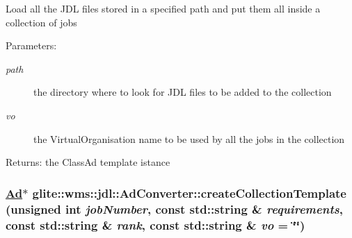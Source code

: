Load all the JDL files stored in a specified path and put them all inside a collection of jobs \begin{Desc}
\item[Parameters:]
\begin{description}
\item[{\em path}]the directory where to look for JDL files to be added to the collection \item[{\em vo}]the Virtual\-Organisation name to be used by all the jobs in the collection \end{description}
\end{Desc}
\begin{Desc}
\item[Returns:]the Class\-Ad template istance\end{Desc}
\hypertarget{classglite_1_1wms_1_1jdl_1_1AdConverter_z21_6}{
\subsubsection[createCollectionTemplate]{\setlength{\rightskip}{0pt plus 5cm}\hyperlink{classglite_1_1wms_1_1jdl_1_1Ad}{Ad}$\ast$ glite::wms::jdl::Ad\-Converter::create\-Collection\-Template (unsigned int {\em job\-Number}, const std::string \& {\em requirements}, const std::string \& {\em rank}, const std::string \& {\em vo} = \char`\"{}\char`\"{})}}
\label{classglite_1_1wms_1_1jdl_1_1AdConverter_z21_6}


